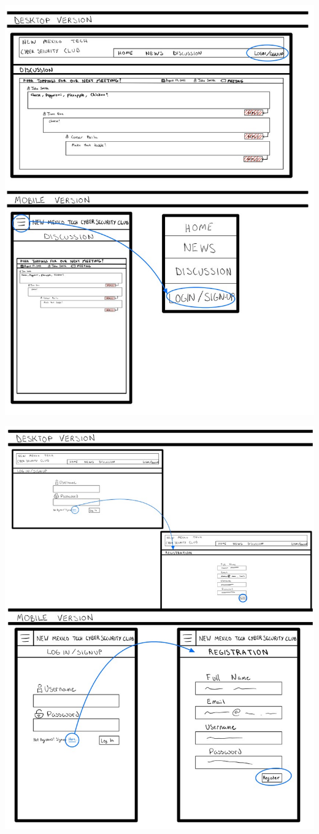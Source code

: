 \documentclass{article}
\begin{document}
\includegraphics[scale=0.60]{visitor_6.jpg}
\par
\includegraphics[scale=0.60]{visitor_7.jpg}
\end{document}
